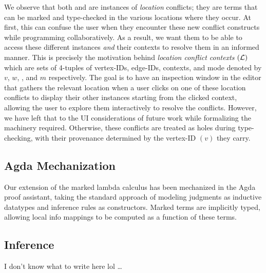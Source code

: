 We observe that both  \uniref and \multiref are instances of \emph{location} conflicts; they are terms that can be marked and type-checked in the various locations where they occur. At first, this can confuse the user when they encounter these new conflict constructs while programming collaboratively. As a result, we want them to be able to access these different instances \emph{and} their contexts to resolve them in an informed manner. This is precisely the motivation behind \emph{location conflict contexts} $(\mathcal{L})$ which are sets of 4-tuples of vertex-IDs, edge-IDs, contexts, and mode denoted by $v$, $w$, \ctx, and $m$ respectively. The goal is to have an inspection window in the editor that gathers the relevant location when a user clicks on one of these location conflicts to display their other instances starting from the clicked context, allowing the user to explore them interactively to resolve the conflicts. However, we have left that to the UI considerations of future work while formalizing the machinery required. Otherwise, these conflicts are treated as holes during type-checking, with their provenance determined by the vertex-ID $(v)$ they carry.

\subsection{Agda Mechanization}
\label{sub:marking-agda}
Our extension of the marked lambda calculus has been mechanized in the Agda proof assistant, taking the standard approach of modeling judgments as inductive datatypes and inference rules as constructors. Marked terms are implicitly typed, allowing local info mappings to be computed as a function of these terms.


\subsection{Inference}
\label{sub:inference}

I don't know what to write here lol \ldots


